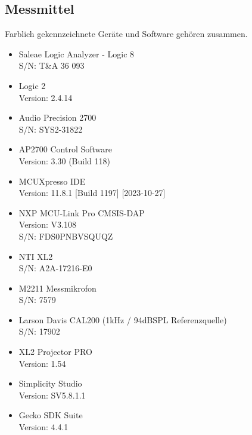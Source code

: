\documentclass[12pt]{article}
\begin{document}
	\newpage
	\subsection{Messmittel} \label{Messmittel}
	Farblich gekennzeichnete Geräte und Software gehören zusammen.
\begin{itemize}
	\color{green}
	\item Saleae Logic Analyzer - Logic 8 \\
	S/N: T\&A 36 093
	\item Logic 2 \\
	Version: 2.4.14
	\color{red}
	\item Audio Precision 2700 \\
	S/N: SYS2-31822
	\item AP2700 Control Software \\
	Version: 3.30 (Build 118)
	\color{blue}
	\item MCUXpresso IDE\\
	Version: 11.8.1 [Build 1197] [2023-10-27]
	\item NXP MCU-Link Pro CMSIS-DAP \\
	Version: V3.108 \\
	S/N: FDS0PNBVSQUQZ
	\color{brown}
	\item NTI XL2 \\
	S/N: A2A-17216-E0
	\item M2211 Messmikrofon \\
	S/N: 7579
	\item Larson Davis CAL200 (1kHz / 94dBSPL Referenzquelle)\\
	S/N: 17902
	\item XL2 Projector PRO\\
	Version: 1.54
	\color{orange}
	\item Simplicity Studio \\
	Version: SV5.8.1.1
	\item Gecko SDK Suite \\
	Version: 4.4.1
	\color{black}
	\end{itemize}
	
	\newpage
\end{document}
